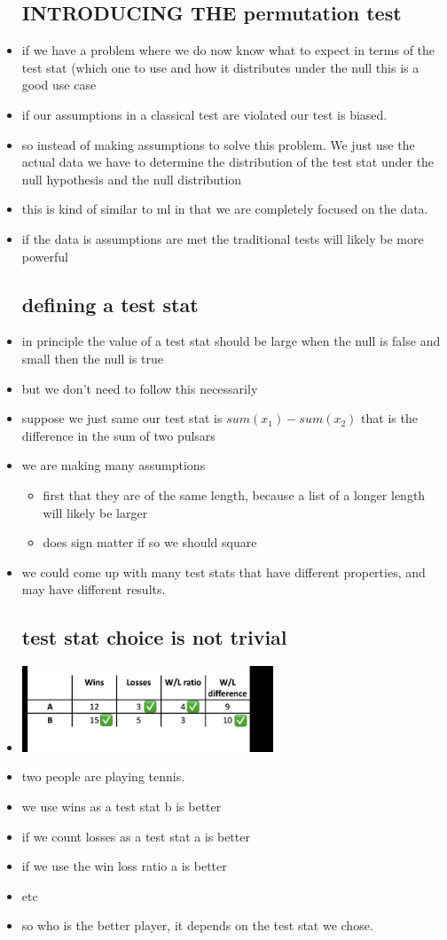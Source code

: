 \documentclass{article}
\begin{document}
\begin{itemize}
\subsection{INTRODUCING THE permutation test}
\item if we have a problem where we do now know what to expect in terms of the test stat (which one to use and how it distributes under the null this is a good use case 
\item if our assumptions in a classical test are violated our test is biased.
\item so instead of making assumptions to solve this problem. We just use the actual data we have to determine the distribution of the test stat under the null hypothesis and the null distribution 
\item this is kind of similar to ml in that we are completely focused on the data. 
\item if the data is assumptions are met the traditional tests will likely be more powerful
\subsection{defining a test stat }
\item in principle the value of a test stat should be large when the null is false and small then the null is true 
\item but we don't need to follow this necessarily 
\item suppose we just same our test stat is $sum(x_1)-sum(x_2)$ that is the difference in the sum of two pulsars
\item we are making many  assumptions 
\begin{itemize}
    \item first that they are of the same length, because a list of a longer length will likely be larger
    \item does sign matter if so we should square
\end{itemize}
\item we could come up with many test stats that have different properties, and may have different results.
\subsection{ test stat choice is not trivial }
\item \includegraphics[width=7.5cm]{Final_Review/lecture_7/test_stat_exmaple.jpg}
\item two people are playing tennis. 
\item we use wins as a test stat b is better 
\item if we count losses as a test stat a is better 
\item if we use the win loss ratio a is better 
\item etc 
\item so who is the better player, it depends on the test stat we chose. 

\end{itemize}
\end{document}
